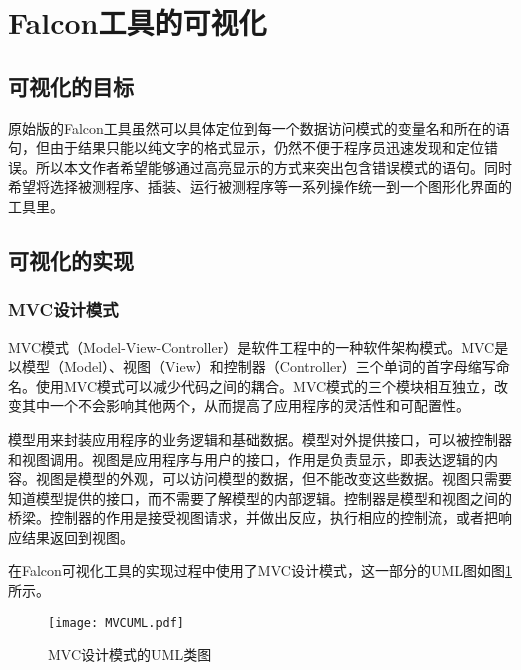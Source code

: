 ﻿\section{Falcon工具的可视化}
\subsection{可视化的目标}
原始版的Falcon工具虽然可以具体定位到每一个数据访问模式的变量名和所在的语句，但由于结果只能以纯文字的格式显示，仍然不便于程序员迅速发现和定位错误。所以本文作者希望能够通过高亮显示的方式来突出包含错误模式的语句。同时希望将选择被测程序、插装、运行被测程序等一系列操作统一到一个图形化界面的工具里。
\subsection{可视化的实现}
\subsubsection{MVC设计模式}
MVC模式（Model-View-Controller）是软件工程中的一种软件架构模式。MVC是以模型（Model）、视图（View）和控制器（Controller）三个单词的首字母缩写命名。使用MVC模式可以减少代码之间的耦合。MVC模式的三个模块相互独立，改变其中一个不会影响其他两个，从而提高了应用程序的灵活性和可配置性。\par
模型用来封装应用程序的业务逻辑和基础数据。模型对外提供接口，可以被控制器和视图调用。视图是应用程序与用户的接口，作用是负责显示，即表达逻辑的内容。视图是模型的外观，可以访问模型的数据，但不能改变这些数据。视图只需要知道模型提供的接口，而不需要了解模型的内部逻辑。控制器是模型和视图之间的桥梁。控制器的作用是接受视图请求，并做出反应，执行相应的控制流，或者把响应结果返回到视图\cite{LiMVC}。\par
在Falcon可视化工具的实现过程中使用了MVC设计模式，这一部分的UML图如图\ref{pic:MVCUML}所示。
\begin{figure}[!ht]
  \centering
  \texttt{[image: MVCUML.pdf]}\\
  \caption{MVC设计模式的UML类图}\label{pic:MVCUML}
\end{figure}
